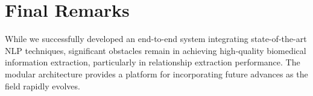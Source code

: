 
\section{Final Remarks}

While we successfully developed an end-to-end system integrating state-of-the-art NLP techniques, significant obstacles remain in achieving high-quality biomedical information extraction, particularly in relationship extraction performance. The modular architecture provides a platform for incorporating future advances as the field rapidly evolves.